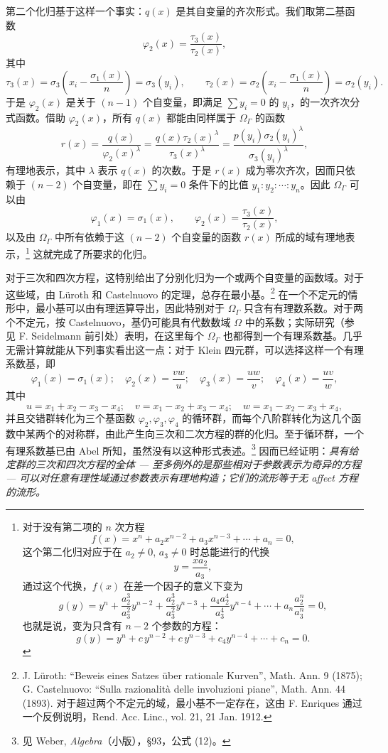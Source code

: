 第二个化归基于这样一个事实：$q(x)$ 是其自变量的齐次形式。我们取第二基函数
\[
\varphi_2(x)=\frac{\tau_3(x)}{\tau_2(x)},
\]
其中
\[
\tau_3(x)=\sigma_3\left(x_i-\frac{\sigma_1(x)}{n}\right)=\sigma_3(y_i),
\qquad
\tau_2(x)=\sigma_2\left(x_i-\frac{\sigma_1(x)}{n}\right)=\sigma_2(y_i).
\]
于是 $\varphi_2(x)$ 是关于 $(n-1)$ 个自变量，即满足 $\sum y_i=0$ 的 $y_i$，的一次齐次分式函数。借助 $\varphi_2(x)$，所有 $q(x)$ 都能由同样属于 $\Omega_\Gamma$ 的函数
\[
r(x)=\frac{q(x)}{\varphi_2(x)^\lambda}
=\frac{q(x)\tau_2(x)^\lambda}{\tau_3(x)^\lambda}
=\frac{p(y_i)\sigma_2(y_i)^\lambda}{\sigma_3(y_i)^\lambda},
\]
有理地表示，其中 $\lambda$ 表示 $q(x)$ 的次数。于是 $r(x)$ 成为零次齐次，因而只依赖于 $(n-2)$ 个自变量，即在 $\sum y_i=0$ 条件下的比值 $y_1:y_2:\cdots:y_n$。因此 $\Omega_\Gamma$ 可以由
\[
\varphi_1(x)=\sigma_1(x),
\qquad
\varphi_2(x)=\frac{\tau_3(x)}{\tau_2(x)},
\]
以及由 $\Omega_\Gamma$ 中所有依赖于这 $(n-2)$ 个自变量的函数 $r(x)$ 所成的域有理地表示，\footnote{对于没有第二项的 $n$ 次方程
\[
f(x)=x^n+a_2x^{n-2}+a_3x^{n-3}+\cdots+a_n=0,
\]
这个第二化归对应于在 $a_2\ne0$, $a_3\ne0$ 时总能进行的代换
\[
y=\frac{x a_2}{a_3},
\]
通过这个代换，$f(x)$ 在差一个因子的意义下变为
\[
g(y)=y^n+\frac{a_2^3}{a_3^2}y^{n-2}+\frac{a_2^3}{a_3^2}y^{n-3}
+\frac{a_4a_2^4}{a_3^4}y^{n-4}+\cdots+a_n\frac{a_2^n}{a_3^n}=0,
\]
也就是说，变为只含有 $n-2$ 个参数的方程：
\[
g(y)=y^n+c\,y^{n-2}+c\,y^{n-3}+c_4y^{n-4}+\cdots+c_n=0.
\]} 这就完成了所要求的化归。

对于三次和四次方程，这特别给出了分别化归为一个或两个自变量的函数域。对于这些域，由 Lüroth 和 Castelnuovo 的定理，总存在最小基。\footnote{J. Lüroth: “Beweis eines Satzes über rationale Kurven”, Math. Ann. 9 (1875); G. Castelnuovo: “Sulla razionalità delle involuzioni piane”, Math. Ann. 44 (1893). 对于超过两个不定元的域，最小基不一定存在，这由 F. Enriques 通过一个反例说明，Rend. Acc. Linc., vol. 21, 21 Jan. 1912.} 在一个不定元的情形中，最小基可以由有理运算导出，因此特别对于 $\Omega_\Gamma$ 只含有有理数系数。对于两个不定元，按 Castelnuovo，基仍可能具有代数数域 $\Omega$ 中的系数；实际研究（参见 F. Seidelmann 前引处）表明，在这里每个 $\Omega_\Gamma$ 也都得到一个有理系数基。几乎无需计算就能从下列事实看出这一点：对于 Klein 四元群，可以选择这样一个有理系数基，即
\[
\varphi_1(x)=\sigma_1(x);\quad
\varphi_2(x)=\frac{vw}{u};\quad
\varphi_3(x)=\frac{uw}{v};\quad
\varphi_4(x)=\frac{uv}{w},
\]
其中
\[
u=x_1+x_2-x_3-x_4;\quad v=x_1-x_2+x_3-x_4;\quad w=x_1-x_2-x_3+x_4,
\]
并且交错群转化为三个基函数 $\varphi_2,\varphi_3,\varphi_4$ 的循环群，而每个八阶群转化为这几个函数中某两个的对称群，由此产生向三次和二次方程的群的化归。至于循环群，一个有理系数基已由 Abel 所知，虽然没有以这种形式表述。\footnote{见 Weber, \emph{Algebra}（小版），\S 93，公式 (12)。} 因而已经证明：\emph{具有给定群的三次和四次方程的全体 --- 至多例外的是那些相对于参数表示为奇异的方程 --- 可以对任意有理性域通过参数表示有理地构造；它们的流形等于无 affect 方程的流形。}


